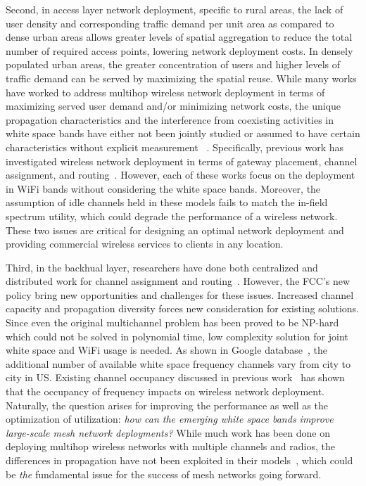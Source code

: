 Second, in access layer network deployment, specific to rural areas, 
the lack of user density and corresponding traffic demand per unit area 
as compared to dense urban areas allows greater levels of spatial 
aggregation to reduce the total number of required access points, 
lowering network deployment costs. In densely populated urban areas, 
the greater concentration of users and higher levels of traffic demand 
can be served by maximizing the spatial reuse. While many works have 
worked to address multihop wireless network deployment in terms of 
maximizing served user demand and/or minimizing network costs, the 
unique propagation characteristics and the interference from coexisting
activities in white space bands have either not been jointly studied 
or assumed to have certain characteristics without explicit measurement
~\cite{si2010overview}. Specifically, previous work has investigated 
wireless network deployment in terms of gateway placement, channel 
assignment, and routing~\cite{he2008optimizing,marina2010topology}.
However, each of these works focus on the deployment in WiFi bands 
without considering the white space bands. Moreover, the assumption 
of idle channels held in these models fails to match the in-field 
spectrum utility, which could degrade the performance of a wireless 
network. These two issues are critical for designing an optimal 
network deployment and providing commercial wireless services to 
clients in any location.

Third, in the backhual layer, researchers have done both centralized and 
distributed work for channel assignment and routing~\cite{raniwala2004centralized,wu2006distributed}.
However, the FCC's new policy bring new opportunities
and challenges for these issues.  Increased channel capacity and 
propagation diversity forces new consideration for existing solutions.
Since even the original multichannel problem has been proved to be NP-hard
which could not be solved in polynomial time, low complexity
solution for joint white space and WiFi usage is needed.
As shown in Google database~\cite{googledatabase}, 
the additional number of available white space frequency channels 
vary from city to city in US. Existing channel occupancy discussed in 
previous work~\cite{pcuiwinmee} has shown that the occupancy of 
frequency impacts on wireless network deployment. Naturally, the 
question arises for improving the performance as well as the optimization 
of utilization: {\it how can the emerging white space bands improve 
large-scale mesh network deployments?}  While much work has been done 
on deploying multihop wireless networks with multiple channels and 
radios, the differences in propagation have not been exploited in their 
models~\cite{tang2005interference, long2013fair,doraghinejad2014channel}, 
which could be {\it the} fundamental issue for the success of mesh 
networks going forward.

